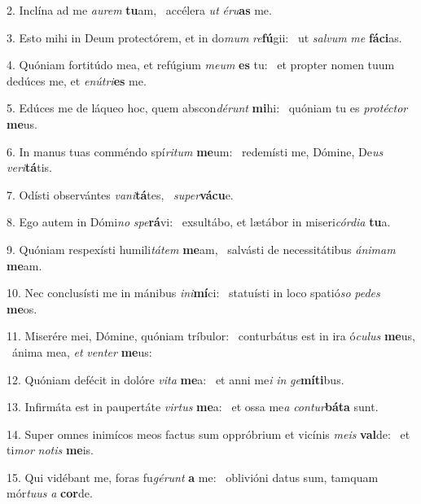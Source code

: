 2. Inclína ad me \textit{au}\textit{rem} \textbf{tu}am, \ast\  accélera \textit{ut} \textit{é}\textit{ru}\textbf{as} me.\

3. Esto mihi in Deum protectórem, et in do\textit{mum} \textit{re}\textbf{fú}gii: \ast\  ut \textit{sal}\textit{vum} \textit{me} \textbf{fá}\textbf{ci}as.\

4. Quóniam fortitúdo mea, et refúgium \textit{me}\textit{um} \textbf{es} tu: \ast\  et propter nomen tuum dedúces me, et \textit{e}\textit{nú}\textit{tri}\textbf{es} me.\

5. Edúces me de láqueo hoc, quem abscon\textit{dé}\textit{runt} \textbf{mi}hi: \ast\  quóniam tu es \textit{pro}\textit{téc}\textit{tor} \textbf{me}us.\

6. In manus tuas comméndo spí\textit{ri}\textit{tum} \textbf{me}um: \ast\  redemísti me, Dómine, De\textit{us} \textit{ve}\textit{ri}\textbf{tá}tis.\

7. Odísti observántes \textit{va}\textit{ni}\textbf{tá}tes, \ast\  \textit{su}\textit{per}\textbf{vá}\textbf{cu}e.\

8. Ego autem in Dómi\textit{no} \textit{spe}\textbf{rá}vi: \ast\  exsultábo, et lætábor in miseri\textit{cór}\textit{di}\textit{a} \textbf{tu}a.\

9. Quóniam respexísti humili\textit{tá}\textit{tem} \textbf{me}am, \ast\  salvásti de necessitátibus \textit{á}\textit{ni}\textit{mam} \textbf{me}am.\

10. Nec conclusísti me in mánibus \textit{in}\textit{i}\textbf{mí}ci: \ast\  statuísti in loco spatió\textit{so} \textit{pe}\textit{des} \textbf{me}os.\

11. Miserére mei, Dómine, quóniam tríbulor: \dag\  conturbátus est in ira ó\textit{cu}\textit{lus} \textbf{me}us, \ast\  ánima mea, \textit{et} \textit{ven}\textit{ter} \textbf{me}us:\

12. Quóniam defécit in dolóre \textit{vi}\textit{ta} \textbf{me}a: \ast\  et anni me\textit{i} \textit{in} \textit{ge}\textbf{mí}\textbf{ti}bus.\

13. Infirmáta est in paupertáte \textit{vir}\textit{tus} \textbf{me}a: \ast\  et ossa me\textit{a} \textit{con}\textit{tur}\textbf{bá}\textbf{ta} sunt.\

14. Super omnes inimícos meos factus sum oppróbrium et vicínis \textit{me}\textit{is} \textbf{val}de: \ast\  et ti\textit{mor} \textit{no}\textit{tis} \textbf{me}is.\

15. Qui vidébant me, foras fu\textit{gé}\textit{runt} \textbf{a} me: \ast\  oblivióni datus sum, tamquam mór\textit{tu}\textit{us} \textit{a} \textbf{cor}de.\

